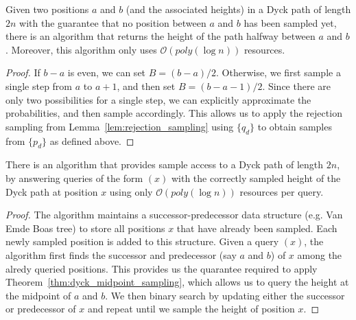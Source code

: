 \begin{theorem}
\label{thm:dyck_midpoint_sampling}
Given two positions $a$ and $b$ (and the associated heights) in a Dyck path of length $2n$
with the guarantee that no position between $a$ and $b$ has been sampled yet,
there is an algorithm that returns the height of the path halfway between $a$ and $b$.
Moreover, this algorithm only uses $\mathcal O(poly(\log n))$ resources.
\end{theorem}
\begin{proof}
If $b-a$ is even, we can set $B = (b-a)/2$.
Otherwise, we first sample a single step from $a$ to $a+1$, and then set $B = (b-a-1)/2$.
Since there are only two possibilities for a single step, we can explicitly approximate the probabilities, and then sample accordingly.
This allows us to apply the rejection sampling from Lemma~\ref{lem:rejection_sampling} using $\{ q_d\}$ to obtain samples from $\{ p_d\}$ as defined above.
\end{proof}

\begin{theorem}
\label{thm:dyck_height_sampling}
There is an algorithm that provides sample access to a Dyck path of length $2n$,
by answering queries of the form $(x)$ with the correctly sampled height of the Dyck path at position $x$
using only $\mathcal O(poly(\log n))$ resources per query.
\end{theorem}
\begin{proof}
The algorithm maintains a successor-predecessor data structure (e.g. Van Emde Boas tree) to store all positions $x$ that have already been sampled.
Each newly sampled position is added to this structure.
Given a query $(x)$, the algorithm first finds the successor and predecessor (say $a$ and $b$) of $x$ among the alredy queried positions.
This provides us the quarantee required to apply Theorem~\ref{thm:dyck_midpoint_sampling},
which allows us to query the height at the midpoint of $a$ and $b$.
We then binary search by updating either the successor or predecessor of $x$ and repeat until we sample the height of position $x$.
\end{proof}




